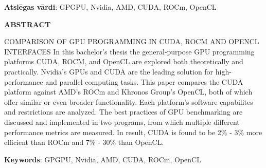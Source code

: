 \documentclass[12pt]{report}%
\theoremstyle{definition}
\begin{document}
\vspace{4mm}
\noindent \textbf{Atslēgas vārdi}: GPGPU, Nvidia, AMD, CUDA, ROCm, OpenCL

\vspace{20mm}
\noindent \textbf{\MakeUppercase{Abstract}}

\noindent \MakeUppercase{Comparison of GPU Programming in CUDA, ROCm and OpenCL interfaces}
\newline
\newline
In this bachelor's thesis the general-purpose GPU programming platforms CUDA,
ROCM, and OpenCL are explored both theoretically and practically. Nvidia's GPUs
and CUDA are the leading solution for high-performance and parallel computing
tasks. This paper compares the CUDA platform against AMD's ROCm and Khronos
Group's OpenCL, both of which offer similar or even broader functionality. Each
platform's software capabilites and restrictions are analyzed. The best
practices of GPU benchmarking are discussed and implemented in two programs,
from  which multiple different performance metrics are measured. In result,
CUDA is found to be  2\% - 3\% more efficient than ROCm and 7\% - 30\% than
OpenCL.

\vspace{4mm}
\noindent \textbf{Keywords}: GPGPU, Nvidia, AMD, CUDA, ROCm, OpenCL

\newpage
\tableofcontents
\newpage


\end{document}
